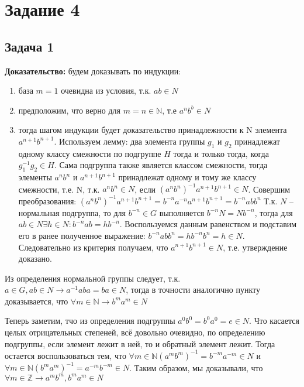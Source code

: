\documentclass[a4paper,14pt]{article} %
\begin{document}

\section{Задание 4}
\subsection{Задача 1}
\textbf{Доказательство:} будем доказывать по индукции:

\begin{enumerate}
	\item база $m = 1$ очевидна из условия, т.к. $ab \in N$
	\item предположим, что верно для $m = n \in \mathds{N}$, т.е $a^nb^b \in N$
	\item тогда шагом индукции будет доказательство принадлежности к N элемента $a^{n+1}b^{n+1}$. 
	Используем лемму: два элемента группы $g_1$ и $g_2$ принадлежат одному классу смежности по подгруппе $H$ тогда и только тогда, когда $g_1^{-1}g_2 \in H$.
	Сама подгруппа также является классом смежности, тогда элементы $a^nb^n$ и $a^{n+1}b^{n+1}$ принадлежат одному и тому же классу смежности, т.е. N, т.к. $a^nb^n \in N$,
	если $(a^nb^n)^{-1}a^{n+1}b^{n+1} \in N$. Совершим преобразования: $(a^nb^n)^{-1}a^{n+1}b^{n+1} = b^{-n}a^{-n}a^{n+1}b^{n+1} = b^{-n}abb^{n}$
	Т.к. $N$ -- нормальная подгруппа, то для $b^{-n} \in G$ выполняется $b^{-n}N = Nb^{-n}$, тогда для $ab \in N \exists h \in N : b^{-n}ab = hb^{-n}$. Воспользуемся данным равенством
	и подставим его в ранее полученное выражение: $b^{-n}abb^{n} = h b^{-n} b^{n} = h \in N$. Следовательно из критерия получаем, что $a^{n+1}b^{n+1} \in N$, т.е. утверждение доказано.
\end{enumerate}

Из определения нормальной группы следует, т.к. $a \in G, ab \in N \rightarrow a^{-1}aba = ba \in N$, тогда в точности аналогично пункту доказывается, что $\forall m \in \mathds{N} \rightarrow b^ma^m \in N$

Теперь заметим, тчо из определения подгруппы $a^0b^0 = b^0a^0 = e \in N$. Что касается целых отрицательных степеней, всё довольно очевидно, по определению подгруппы, если элемент лежит в ней, то и обратный элемент лежит.
Тогда остается воспользоваться тем, что $\forall m \in \mathds{N} (a^mb^m)^{-1} = b^{-m}a^{-m} \in N$ и $\forall m \in \mathds{N} (b^ma^m)^{-1} = a^{-m}b^{-m} \in N$. Таким образом, мы доказывали, что $\forall m \in \mathds{Z} \rightarrow a^mb^m, b^ma^m \in N$
\end{document}
